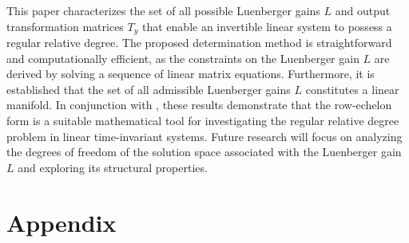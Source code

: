 \documentclass[sort&compress]{elsarticle}
\begin{document}
This paper characterizes the set of all possible Luenberger gains $L$ and output transformation matrices $T_y$ that enable an invertible linear system to possess a regular relative degree.
The proposed determination method is straightforward and computationally efficient, as the constraints on the Luenberger gain $L$ are derived by solving a sequence of linear matrix equations.
Furthermore, it is established that the set of all admissible Luenberger gains $L$ constitutes a linear manifold.
In conjunction with \cite{Cao2025rrdref[J]}, these results demonstrate that the row-echelon form is a suitable mathematical tool for investigating the regular relative degree problem in linear time-invariant systems.
Future research will focus on analyzing the degrees of freedom of the solution space associated with the Luenberger gain $L$ and exploring its structural properties.



\section*{Appendix}
\end{document}
